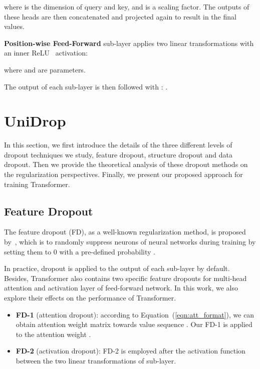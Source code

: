 \documentclass[11pt]{article}
\begin{document}
where  is the dimension of query and key, and  is a scaling factor. The outputs of these heads are then concatenated and projected again to result in the final values. 


\noindent \textbf{Position-wise Feed-Forward} sub-layer applies two linear transformations with an inner ReLU~\cite{nair2010rectified} activation:

where  and  are parameters.

The output of each sub-layer is then followed with : . 






\section{UniDrop}
\label{sec:unidrop}
In this section, we first introduce the details of the three different levels of dropout techniques we study, feature dropout, structure dropout and data dropout. Then we provide the theoretical analysis of these dropout methods on the regularization perspectives. Finally, we present our proposed  approach for training Transformer. 




\subsection{Feature Dropout}
\label{sec:feature_dropout}
The feature dropout (FD), as a well-known regularization method, is proposed by~, which is to randomly suppress neurons of neural networks during training by setting them to 0 with a pre-defined probability . 

In practice, dropout is applied to the output of each sub-layer by default. Besides, Transformer also contains two specific feature dropouts for multi-head attention and activation layer of feed-forward network. In this work, we also explore their effects on the performance of Transformer.

\begin{itemize}
    \item \textbf{FD-1} (attention dropout): according to Equation~(\ref{eqn:att_format}), we can obtain attention weight matrix  towards value sequence . Our FD-1 is applied to the attention weight .
    \item \textbf{FD-2} (activation dropout): FD-2 is employed after the activation function between the two linear transformations of  sub-layer.
\end{itemize}
\end{document}
